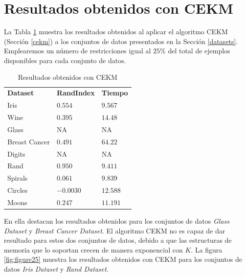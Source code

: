 \clearpage

\section{Resultados obtenidos con CEKM}

La Tabla \ref{tab:tabla8} muestra los resultados obtenidos al aplicar el algoritmo \acf{CEKM} (Sección \ref{cekm}) a los conjuntos de datos presentados en la Sección \ref{datasets}. Emplearemos un número de restricciones igual al $25\%$ del total de ejemplos disponibles para cada conjunto de datos.

\begin{table}[!h]
	\centering
	\setlength{\arrayrulewidth}{1mm}
	\setlength{\tabcolsep}{10pt}
	\renewcommand{\arraystretch}{0.9}
	
	\begin{tabular}{ >{\centering\arraybackslash}m{2.5cm}  >{\centering\arraybackslash}m{1.8cm}>{\centering\arraybackslash}m{1.5cm}}
		\hline
		\rowcolor{black}
		\multicolumn{3}{c}{\bf \color{white}{Resultados obtenidos con CEKM}}\\
		\hline
		\rowcolor{gray!50}
		\textbf{Dataset} & \textbf{RandIndex} & \textbf{Tiempo}  \\
		Iris & $0.554$ & $9.567$  \\
		Wine & $0.395$ & $14.48$  \\
		Glass & NA & NA  \\
		Breast Cancer & $0.491$ & $64.22$  \\
		Digits & NA & NA  \\
		Rand & $0.950$ & $9.411$  \\
		Spirals & $0.061$ & $9.839$  \\
		Circles & $-0.0030$ & $12.588$  \\
		Moons & $0.247$ & $11.191$  \\
		\hline
		
	\end{tabular}
	\caption{Resultados obtenidos con \acs{CEKM}}
	\label{tab:tabla8}
\end{table}

En ella destacan los resultados obtenidos para los conjuntos de datos \textit{Glass Dataset} y \textit{Breast Cancer Dataset}. El algoritmo \acs{CEKM} no es capaz de dar resultado para estos dos conjuntos de datos, debido a que las estructuras de memoria que lo soportan crecen de manera exponencial con $K$. La figura \ref{fig:figure25} muestra los resultados obtenidos con \acs{CEKM} para los conjuntos de datos \textit{Iris Dataset} y \textit{Rand Dataset}.

